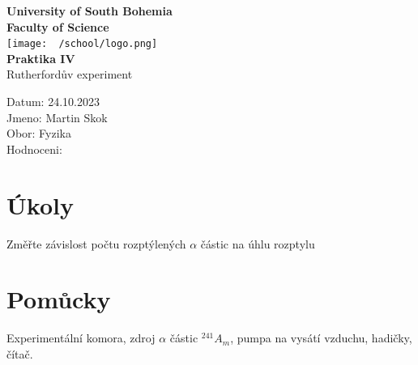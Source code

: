\documentclass{article}
\begin{document}
\begin{center}
\textbf{\Huge{University of South Bohemia}}\\
\vspace{50px}
\textbf{\Large{Faculty of Science}} \\
\vspace{30px}
\texttt{[image: ~/school/logo.png]} \\
\vspace{30px}
\textbf{\large{Praktika IV}}
\vspace{20px}
\\
\vspace{20px}
\large{Rutherfordův experiment} \\
\vspace{60px}
\end{center}
\begin{flushleft}
Datum: 24.10.2023 \\
Jmeno: Martin Skok \\
Obor: Fyzika \\
Hodnoceni:
\end{flushleft}
\newpage
\section{Úkoly}
Změřte závislost počtu rozptýlených $\alpha$ částic na úhlu rozptylu
\section{Pomůcky}
Experimentální komora, zdroj $\alpha$ částic $^{241}A_{m}$, pumpa na vysátí vzduchu, hadičky, čítač.
\end{document}
